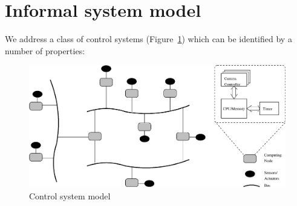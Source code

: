 \section{Informal system model \label{sec:bcinformalmodel}}
We address a class of control systems (Figure~\ref{fig:sysmod}) which
can be identified by a number of properties:
\begin{figure}
\begin{center}
\includegraphics[width=.8\linewidth]{BCANDLE/sysmod.eps}
\end{center}
\caption{Control system model\label{fig:sysmod}}
\end{figure}
